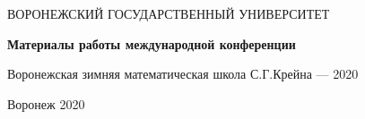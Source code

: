 \begin{titlepage}
   \begin{center}
   ВОРОНЕЖСКИЙ ГОСУДАРСТВЕННЫЙ УНИВЕРСИТЕТ
   \end{center}
\vspace{40mm}

    \begin{center}
      {\LARGE
      \bf

{\bf Материалы работы международной конференции}

 Воронежская зимняя математическая школа С.Г.Крейна --- 2020}

\vspace{10mm}


  \end{center}

 \begin{center}
   \vspace{50mm} Воронеж 2020
 \end{center}
\end{titlepage}
